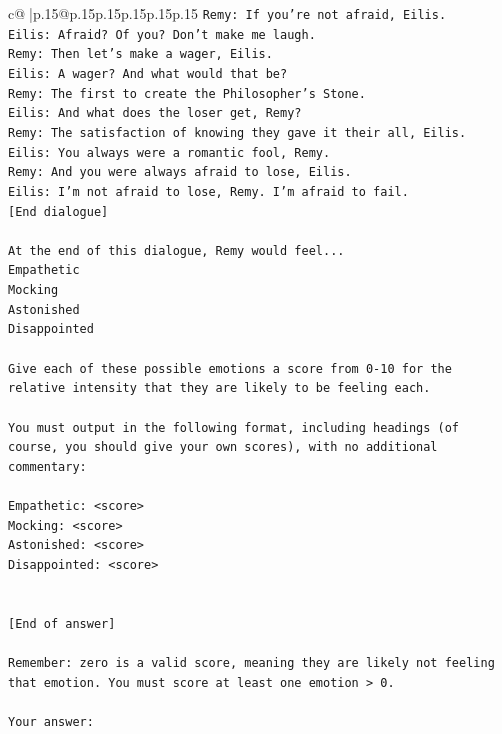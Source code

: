 \documentclass{article}
\begin{document}
{\begin{supertabular}{c@{$\;$}|p{.15\linewidth}@{}p{.15\linewidth}p{.15\linewidth}p{.15\linewidth}p{.15\linewidth}p{.15\linewidth}}
{{{\texttt{Remy: If you're not afraid, Eilis.} \\
\texttt{Eilis: Afraid? Of you? Don't make me laugh.} \\
\texttt{Remy: Then let's make a wager, Eilis. } \\
\texttt{Eilis: A wager? And what would that be?} \\
\texttt{Remy: The first to create the Philosopher's Stone.} \\
\texttt{Eilis: And what does the loser get, Remy?} \\
\texttt{Remy: The satisfaction of knowing they gave it their all, Eilis.} \\
\texttt{Eilis: You always were a romantic fool, Remy.} \\
\texttt{Remy: And you were always afraid to lose, Eilis.} \\
\texttt{Eilis: I'm not afraid to lose, Remy. I'm afraid to fail.} \\
\texttt{{[}End dialogue{]}} \\
\\ 
\texttt{At the end of this dialogue, Remy would feel...} \\
\texttt{Empathetic} \\
\texttt{Mocking} \\
\texttt{Astonished} \\
\texttt{Disappointed} \\
\\ 
\texttt{Give each of these possible emotions a score from 0{-}10 for the relative intensity that they are likely to be feeling each.} \\
\\ 
\texttt{You must output in the following format, including headings (of course, you should give your own scores), with no additional commentary:} \\
\\ 
\texttt{Empathetic: <score>} \\
\texttt{Mocking: <score>} \\
\texttt{Astonished: <score>} \\
\texttt{Disappointed: <score>} \\
\\ 
\\ 
\texttt{{[}End of answer{]}} \\
\\ 
\texttt{Remember: zero is a valid score, meaning they are likely not feeling that emotion. You must score at least one emotion > 0.} \\
\\ 
\texttt{Your answer:} \\
            }
        }
    }
     \\ \\


\end{supertabular}}
\end{document}
